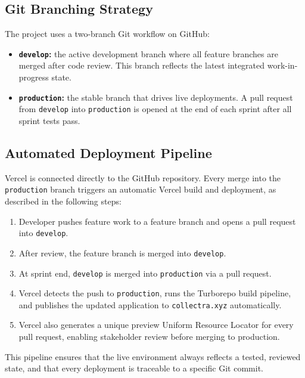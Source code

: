\documentclass[12pt,a4paper]{report}
\begin{document}
\subsection{Git Branching Strategy}

The project uses a two-branch Git workflow on GitHub:

\begin{itemize}
  \item \textbf{\texttt{develop}:} the active development branch where all feature
        branches are merged after code review. This branch reflects the latest
        integrated work-in-progress state.
  \item \textbf{\texttt{production}:} the stable branch that drives live deployments.
        A pull request from \texttt{develop} into \texttt{production} is opened at
        the end of each sprint after all sprint tests pass.
\end{itemize}

\subsection{Automated Deployment Pipeline}

Vercel is connected directly to the GitHub repository.
Every merge into the \texttt{production} branch triggers an automatic Vercel build
and deployment, as described in the following steps:

\begin{enumerate}
  \item Developer pushes feature work to a feature branch and opens a pull request into \texttt{develop}.
  \item After review, the feature branch is merged into \texttt{develop}.
  \item At sprint end, \texttt{develop} is merged into \texttt{production} via a pull request.
  \item Vercel detects the push to \texttt{production}, runs the Turborepo build pipeline,
        and publishes the updated application to \texttt{collectra.xyz} automatically.
  \item Vercel also generates a unique preview Uniform Resource Locator for every pull request, enabling
        stakeholder review before merging to production.
\end{enumerate}

This pipeline ensures that the live environment always reflects a tested, reviewed
state, and that every deployment is traceable to a specific Git commit.
\end{document}
